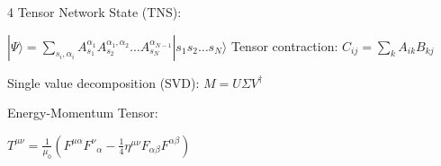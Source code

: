 \documentclass[a4paper,twoside]{article}
\begin{document}
\begin{multicols*}{4}
Tensor Network State (TNS):

\(|\Psi\rangle = \sum_{s_i,\alpha_i} A_{s_1}^{\alpha_1} A^{ \alpha_1, \alpha_2}_{s_2} \dots A^{\alpha_{N-1}}_{s_N} |s_1 s_2 \dots s_N\rangle\)
Tensor contraction:
\(C_{ij} = \sum_{k} A_{ik} B_{kj}\)

Single value decomposition (SVD): \(M = U \Sigma V^\dagger\)

Energy-Momentum Tensor:

$T^{\mu\nu} = \frac{1}{\mu_0}\left(F^{\mu\alpha}F^\nu{}_\alpha - \frac{1}{4}\eta^{\mu\nu}F_{\alpha\beta}F^{\alpha\beta}\right)$


\end{multicols*}
\end{document}
